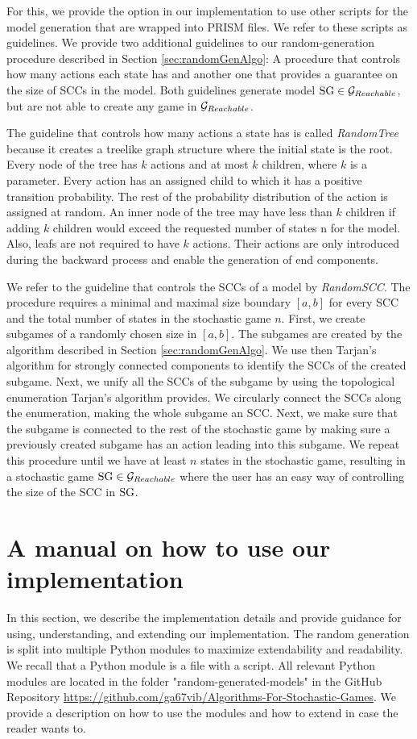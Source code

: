 For this, we provide the option in our implementation to use other scripts for the model generation that are wrapped into PRISM files. We refer to these scripts as guidelines.
We provide two additional guidelines to our random-generation procedure described in Section \ref{sec:randomGenAlgo}: 
A procedure that controls how many actions each state has and another one that provides a guarantee on the size of SCCs in the model.
Both guidelines generate model $\textrm{SG} \in \mathcal{G}_{Reachable}$, but are not able to create any game in $\mathcal{G}_{Reachable}$.

The guideline that controls how many actions a state has is called \emph{RandomTree} 
because it creates a treelike graph structure where the initial state is the root.
Every node of the tree has $k$ actions and at most $k$ children, where $k$ is a parameter. 
Every action has an assigned child to which it has a positive transition probability.
The rest of the probability distribution of the action is assigned at random.
An inner node of the tree may have less than $k$ children if adding $k$ children would exceed the requested number of states n for the model.
Also, leafs are not required to have $k$ actions.
Their actions are only introduced during the backward process and enable the generation of end components.

We refer to the guideline that controls the SCCs of a model by \emph{RandomSCC}.
The procedure requires a minimal and maximal size boundary $[a, b]$ for every SCC and the total number of states in the stochastic game $n$.
First, we create subgames of a randomly chosen size in $[a,b]$.
The subgames are created by the algorithm described in Section \ref{sec:randomGenAlgo}.
We use then Tarjan's algorithm for strongly connected components \cite{TarjansAlgorithm} to identify the SCCs of the created subgame.
Next, we unify all the SCCs of the subgame by using the topological enumeration Tarjan's algorithm provides.
We circularly connect the SCCs along the enumeration, making the whole subgame an SCC.
Next, we make sure that the subgame is connected to the rest of the stochastic game by making sure a previously created subgame has an action
leading into this subgame. We repeat this procedure until we have at least $n$ states in the stochastic game, 
resulting in a stochastic game $\textrm{SG} \in \mathcal{G}_{Reachable}$ where the user has an easy way of controlling the size of the SCC in $\textrm{SG}$.

\section{A manual on how to use our implementation}
In this section, we describe the implementation details and provide guidance for using, understanding, and extending our implementation.
The random generation is split into multiple Python modules to maximize extendability and readability. 
We recall that a Python module is a file with a script.
All relevant Python modules are located in the folder "random-generated-models" in the GitHub Repository \url{https://github.com/ga67vib/Algorithms-For-Stochastic-Games}.
We provide a description on how to use the modules and how to extend in case the reader wants to.

